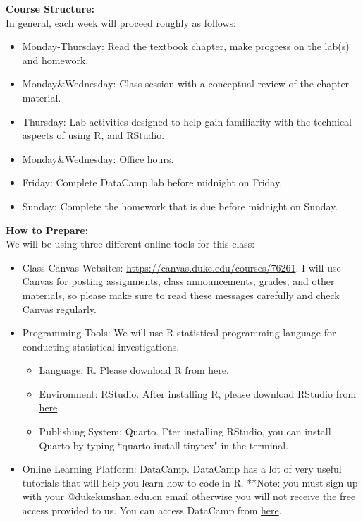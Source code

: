 \documentclass[11pt]{article}
\begin{document}
\vspace{0.5cm}
\large \textbf{Course Structure:}\\[0.5em]
In general, each week will proceed roughly as follows:
\begin{itemize}
    \item Monday-Thursday: Read the textbook chapter, make progress on the lab(s) and homework.
    \item Monday\&Wednesday: Class session with a conceptual review of the chapter material.
    \item Thursday: Lab activities designed to help gain familiarity with the technical aspects of using R, and RStudio.
    \item Monday\&Wednesday: Office hours.
    \item Friday: Complete DataCamp lab before midnight on Friday.
    \item Sunday: Complete the homework that is due before midnight on Sunday.
\end{itemize}





\vspace{0.5cm}
\large \textbf{How to Prepare:}\\[0.5em]
We will be using three different online tools for this class:
\begin{itemize}
    \item Class Canvas Websites: \href{https://canvas.duke.edu/courses/76261}{https://canvas.duke.edu/courses/76261}. I will use Canvas for posting assignments, class announcements, grades, and other materials, so please make sure to read these messages carefully and check Canvas regularly.
    \item Programming Tools: We will use R statistical programming language for conducting statistical investigations. 
    \begin{itemize}
        \item Language: R. Please download R from \href{https://cran.r-project.org/}{here}.
        \item Environment: RStudio. After installing R, please download RStudio from \href{https://posit.co/download/rstudio-desktop/}{here}.
        \item Publishing System: Quarto. Fter installing RStudio, you can install Quarto by typing ``quarto install tinytex" in the terminal.
    \end{itemize}
    \item Online Learning Platform: DataCamp. DataCamp has a lot of very useful tutorials that will help you learn how to code in R. **Note: you must sign up with your @dukekunshan.edu.cn email otherwise you will not receive the free access provided to us. You can access DataCamp from \href{https://www.datacamp.com/}{here}. 
\end{itemize}
\end{document}
